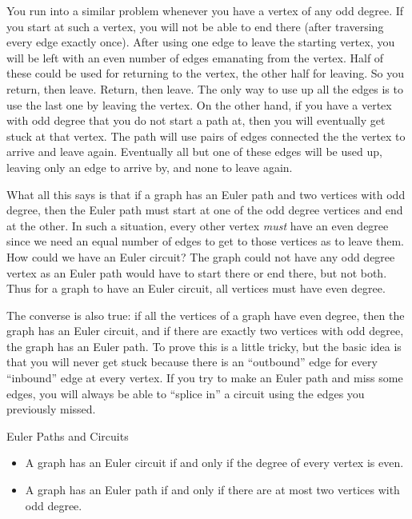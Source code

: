 \documentclass[12pt]{article}
\begin{document}
You run into a similar problem whenever you have a vertex of any odd degree.  If you start at such a vertex, you will not be able to end there (after traversing every edge exactly once).  After using one edge to leave the starting vertex, you will be left with an even number of edges emanating from the vertex.  Half of these could be used for returning to the vertex, the other half for leaving.  So you return, then leave.  Return, then leave.  The only way to use up all the edges is to use the last one by leaving the vertex.  On the other hand, if you have a vertex with odd degree that you do not start a path at, then you will eventually get stuck at that vertex.  The path will use pairs of edges connected the the vertex to arrive and leave again.  Eventually all but one of these edges will be used up, leaving only an edge to arrive by, and none to leave again.

What all this says is that if a graph has an Euler path and two vertices with odd degree, then the Euler path must start at one of the odd degree vertices and end at the other.  In such a situation, every other vertex {\em must} have an even degree since we need an equal number of edges to get to those vertices as to leave them.  How could we have an Euler circuit?  The graph could not have any odd degree vertex as an Euler path would have to start there or end there, but not both.  Thus for a graph to have an Euler circuit, all vertices must have even degree.  

The converse is also true: if all the vertices of a graph have even degree, then the graph has an Euler circuit, and if there are exactly two vertices with odd degree, the graph has an Euler path.  To prove this is a little tricky, but the basic idea is that you will never get stuck because there is an ``outbound'' edge for every ``inbound'' edge at every vertex.  If you try to make an Euler path and miss some edges, you will always be able to ``splice in'' a circuit using the edges you previously missed.

\begin{defbox}{Euler Paths and Circuits}
\begin{itemize}
 \item A graph has an Euler circuit if and only if the degree of every vertex is even.
 \item A graph has an Euler path if and only if there are at most two vertices with odd degree.
\end{itemize}

\end{defbox}
\end{document}
